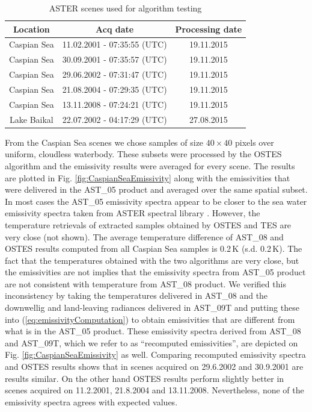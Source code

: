 \begin{table}[!t]
\renewcommand{\arraystretch}{1.5}
\caption{ASTER scenes used for algorithm testing}
\label{table:ASTERScenes}
\centering
\begin{tabular}{ccc}
\hline
Location & Acq date & Processing date \\ \hline
Caspian Sea & 11.02.2001 - 07:35:55 (UTC) & 19.11.2015 \\
Caspian Sea & 30.09.2001 - 07:35:57 (UTC) & 19.11.2015 \\
Caspian Sea & 29.06.2002 - 07:31:47 (UTC) & 19.11.2015 \\
Caspian Sea & 21.08.2004 - 07:29:35 (UTC) & 19.11.2015 \\
Caspian Sea & 13.11.2008 - 07:24:21 (UTC) & 19.11.2015 \\
Lake Baikal & 22.07.2002 - 04:17:29 (UTC) & 27.08.2015 \\
\hline
\end{tabular}
\end{table}

From the Caspian Sea scenes we chose samples of size $40 \times 40$ pixels over uniform, cloudless waterbody. These subsets were processed by the OSTES algorithm and the emissivity results were averaged for every scene. The results are plotted in Fig. \ref{fig:CaspianSeaEmissivity} along with the emissivities that were delivered in the AST\_05 product and averaged over the same spatial subset. In most cases the AST\_05 emissivity spectra appear to be closer to the sea water emissivity spectra taken from ASTER spectral library \cite{baldridge_aster_2009}. However, the temperature retrievals of extracted samples obtained by OSTES and TES are very close (not shown). The average temperature difference of AST\_08 and OSTES results computed from all Caspian Sea samples is 0.2\,K (s.d. 0.2\,K). The fact that the temperatures obtained with the two algorithms are very close, but the emissivities are not implies that the emissivity spectra from AST\_05 product are not consistent with temperature from AST\_08 product. We verified this inconsistency by taking the temperatures delivered in AST\_08 and the downwellig and land-leaving radiances delivered in AST\_09T and putting these into (\ref{eq:emissivityComputation}) to obtain emissivities that are different from what is in the AST\_05 product. These emissivity spectra derived from AST\_08 and AST\_09T, which we refer to as ``recomputed emissivities'', are depicted on Fig. \ref{fig:CaspianSeaEmissivity} as well. Comparing recomputed emissivity spectra and OSTES results shows that in scenes acquired on 29.6.2002 and 30.9.2001 are results similar. On the other hand OSTES results perform slightly better in scenes acquired on 11.2.2001, 21.8.2004 and 13.11.2008. Nevertheless, none of the emissivity spectra agrees with expected values.

